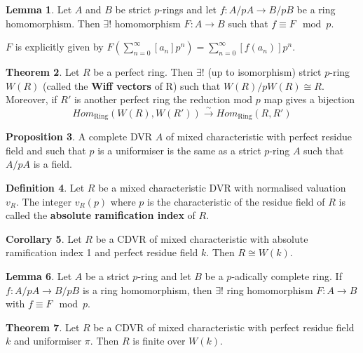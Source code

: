 \documentclass[a4paper]{article}
\theoremstyle{definition}
\newtheorem{definition}{Definition}
\theoremstyle{default}
\newtheorem{lemma}[definition]{Lemma}
\newtheorem{theorem}[definition]{Theorem}
\newtheorem{prop}[definition]{Proposition}
\newtheorem{corollary}[definition]{Corollary}
\theoremstyle{remark}
\begin{document}
\begin{lemma}
	Let $A$ and $B$ be strict $p$-rings and let $f: A/pA \to B/pB$ be a ring homomorphism.
	Then $\exists!$ homomorphism $F:A \to B$ such that $f \equiv F \mod p$.
	
	$F$ is explicitly given by $F(\sum_{n=0}^\infty [a_n]p^n) = \sum_{n=0}^\infty [f(a_n)]p^n$.
\end{lemma}

\begin{theorem}
	Let $R$ be a perfect ring.
	Then $\exists!$ (up to isomorphism) strict $p$-ring $W(R)$ (called the \textbf{Wiff vectors} of R)
	such that $W(R)/pW(R) \cong R$.
	Moreover, if $R'$ is another perfect ring the reduction mod $p$ map gives a bijection
	$$Hom_{\text{Ring}}(W(R), W(R')) \overset{\sim}{\longrightarrow} Hom_{\text{Ring}}(R, R')$$
\end{theorem}

\begin{prop}
	A complete DVR $A$ of mixed characteristic with perfect residue field and such that $p$ is a uniformiser
	is the same as a strict $p$-ring $A$ such that $A/pA$ is a field.
\end{prop}

\begin{definition}
	Let $R$ be a mixed characteristic DVR with normalised valuation $v_R$.
	The integer $v_R(p)$ where $p$ is the characteristic of the residue field of $R$
	is called the \textbf{absolute ramification index} of $R$.
\end{definition}

\begin{corollary}
	Let $R$ be a CDVR of mixed characteristic with absolute ramification index 1 and perfect residue field $k$.
	Then $R \cong W(k)$.
\end{corollary}
\setcounter{definition}{52}
\renewcommand{\thedefinition}{\arabic{definition}'}
\begin{lemma}
	Let $A$ be a strict $p$-ring and let $B$ be a $p$-adically complete ring.
	If $f: A/pA \to B/pB$ is a ring homomorphism,
	then $\exists!$ ring homomorphism $F:A \to B$ with $f \equiv F \mod p$.
\end{lemma}
\setcounter{definition}{57}
\renewcommand{\thedefinition}{\arabic{definition}}

\begin{theorem}
	Let $R$ be a CDVR of mixed characteristic with perfect residue field $k$ and uniformiser $\pi$.
	Then $R$ is finite over $W(k)$.
\end{theorem}
\end{document}
